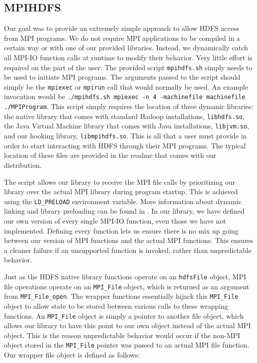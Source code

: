 \subsection{MPIHDFS}
Our goal was to provide an extremely simple approach to allow HDFS access
from MPI programs. We do not require MPI applications to be compiled in a
certain way or with one of our provided libraries. Instead, we dynamically catch
all MPI-IO function calls at runtime to modify their behavior. Very little
effort is required on the part of the user. The provided script
\texttt{mpihdfs.sh} simply needs to be used to initiate MPI programs. The
arguments passed to the script should simply be the \texttt{mpiexec} or
\texttt{mpirun} call that would normally be used. An example invocation would be
\texttt{./mpihdfs.sh mpiexec -n 4 -machinefile machinefile ./MPIProgram}. This
script simply requires the location of three dynamic libraries: the native library
that comes with standard Hadoop installations, \texttt{libhdfs.so}, the Java
Virtual Machine library that comes with Java installations, \texttt{libjvm.so},
and our hooking library, \texttt{libmpihdfs.so}. This is all that a user must
provide in order to start interacting with HDFS through their MPI programs. The
typical location of these files are provided in the readme that comes with our
distribution.

The script allows our library to receive the MPI file calls by prioritizing our
library over the actual MPI library during program startup. This is achieved
using the \texttt{LD\_PRELOAD} environment variable. More information about
dynamic linking and library preloading can be found in \cite{ld.so}. In our
library, we have defined our own version of every single MPI-IO function,
even those we have not implemented. Defining every function lets us ensure there
is no mix up going between our version of MPI functions and the actual MPI
functions. This ensures a cleaner failure if an unsupported function is invoked,
rather than unpredictable behavior. 

Just as the HDFS native library functions operate on an \texttt{hdfsFile}
object, MPI file operations operate on an \texttt{MPI\_File} object, which is
returned as an argument from \texttt{MPI\_File\_open}. The wrapper functions
essentially hijack this \texttt{MPI\_File} object to allow state to be stored
between various calls to these wrapping functions. An \texttt{MPI\_File} object
is simply a pointer to another file object, which allows our library to 
have this point to our own object instead of the actual MPI object. This is the
reason unpredictable behavior would occur if the non-MPI object stored in the
\texttt{MPI\_File} pointer was passed to an actual MPI file function. Our
wrapper file object is defined as follows:

